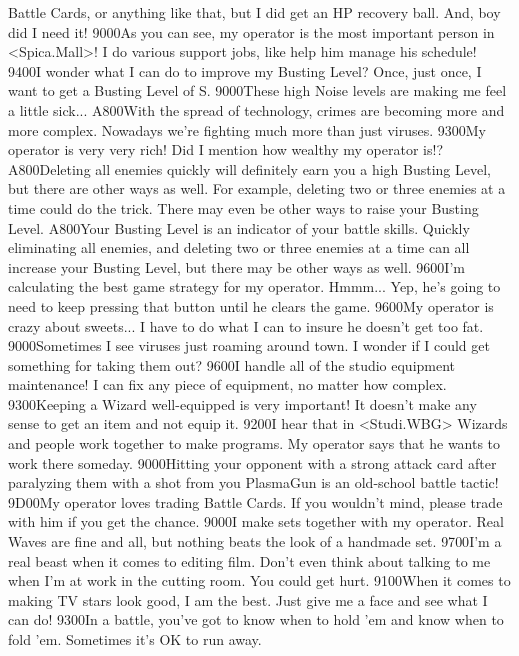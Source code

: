 Battle Cards, or anything like that, but I did get an HP recovery ball. 
And, boy did I need it! 
{90}{00}As you can see, my operator is the most 
important person in <Spica.Mall>! 
I do various support jobs, like help him manage his schedule! 
{94}{00}I wonder what I can do to improve my Busting Level? 
Once, just once, I want to get a Busting Level of S. 
{90}{00}These high Noise levels are making me feel a little sick... 
{A8}{00}With the spread of technology, crimes are 
becoming more and more complex. Nowadays we're 
fighting much more than just viruses. 
{93}{00}My operator is very very rich! 
Did I mention how wealthy my operator is!? 
{A8}{00}Deleting all enemies quickly will definitely earn you a high Busting Level, 
but there are other ways as well. 
For example, deleting two or three enemies at a time could do the trick. 
There may even be other ways to raise your Busting Level. 
{A8}{00}Your Busting Level is an indicator of your battle skills. 
Quickly eliminating all enemies, and deleting two or three enemies at a time 
can all increase your Busting Level, 
but there may be other ways as well. 
{96}{00}I'm calculating the best game strategy for my operator. Hmmm... 
Yep, he's going to need to keep pressing that button until he clears the game. 
{96}{00}My operator is crazy about sweets... 
I have to do what I can to insure he doesn't get too fat. 
{90}{00}Sometimes I see viruses just roaming around town. 
I wonder if I could get something for taking them out? 
{96}{00}I handle all of the studio equipment maintenance! 
I can fix any piece of equipment, no matter how complex. 
{93}{00}Keeping a Wizard well-equipped is very important! 
It doesn't make any sense to get an item and not equip it. 
{92}{00}I hear that in <Studi.WBG> Wizards and people work together to make programs. 
My operator says that he wants to work there someday. 
{90}{00}Hitting your opponent with a strong attack card after paralyzing them with a 
shot from you PlasmaGun is an old-school battle tactic! 
{9D}{00}My operator loves trading Battle Cards. 
If you wouldn't mind, please trade with him if you get the chance. 
{90}{00}I make sets together with my operator. 
Real Waves are fine and all, but nothing beats the look of a handmade set. 
{97}{00}I'm a real beast when it comes to editing film. 
Don't even think about talking to me when I'm at work in the cutting room. 
You could get hurt. 
{91}{00}When it comes to making TV stars look good, I am 
the best. Just give me a face and see what I can do! 
{93}{00}In a battle, you've got to know when to hold 'em and 
know when to fold 'em. Sometimes it's OK to run away. 
